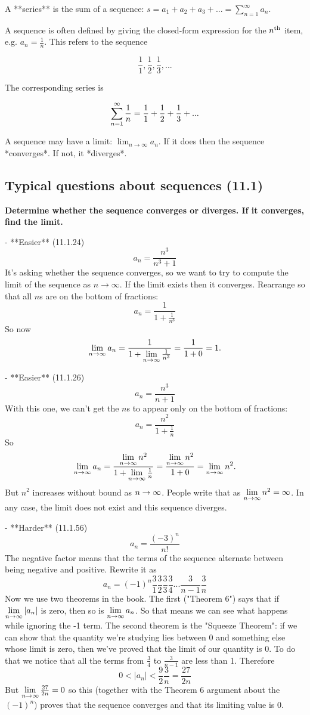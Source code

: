 A **series** is the sum of a sequence: $s = a_1 + a_2 + a_3 + ... = \sum_{n=1}^\infty a_n$.

A sequence is often defined by giving the closed-form expression for the $n^{\text{th}}$ item, e.g. $a_n = \frac{1}{n}$. This refers to the sequence

$$\frac{1}{1}, \frac{1}{2}, \frac{1}{3}, ...$$

The corresponding series is

$$
\sum_{n=1}^{\infty} \frac{1}{n} = \frac{1}{1} + \frac{1}{2} + \frac{1}{3} + ...
$$

A sequence may have a limit: $\lim_{n \rightarrow \infty} a_n$. If it does then the sequence *converges*. If not, it *diverges*.

\subsection{Typical questions about sequences (11.1)}


\textbf*{Determine whether the sequence converges or diverges. If it converges, find the limit.}

- **Easier** (11.1.24)
  $$
  a_n = \frac{n^3}{n^3 + 1}
  $$
  It's asking whether the sequence converges, so we want to try to compute the limit of the sequence as $n \rightarrow \infty$. If the limit exists then it converges. Rearrange so that all $n$s are on the bottom of fractions:
  $$
  a_n = \frac{1}{1 + \frac{1}{n^3}}
  $$
  So now
  $$
  \lim\limits_{n \to \infty} a_n = \frac{1}{1 + \lim\limits_{n \to \infty}\frac{1}{n^3}} = \frac{1}{1 + 0} = 1.
  $$

- **Easier** (11.1.26)
  $$
  a_n = \frac{n^3}{n + 1}
  $$
  With this one, we can't get the $n$s to appear only on the bottom of fractions:
  $$
  a_n = \frac{n^2}{1 + \frac{1}{n}}
  $$
  So
  $$
  \lim\limits_{n \to \infty} a_n = \frac{\lim\limits_{n \to \infty} n^2}{1 + \lim\limits_{n \to \infty}\frac{1}{n}} = \frac{\lim\limits_{n \to \infty} n^2}{1 + 0} = \lim\limits_{n \to \infty} n^2.
  $$
  But $n^2$ increases without bound as $n \rightarrow \infty$. People write that as $\lim\limits_{n \to \infty} n^2 = \infty$. In any case, the limit does not exist and this sequence diverges.

- **Harder** (11.1.56)
  $$
  a_n = \frac{(-3)^n}{n!}
  $$
  The negative factor means that the terms of the sequence alternate between being negative and positive. Rewrite it as
  $$
  a_n = (-1)^n\frac{3}{1}\frac{3}{2}\frac{3}{3}\frac{3}{4}...\frac{3}{n-1}\frac{3}{n}
  $$
  Now we use two theorems in the book. The first ("Theorem 6") says that if $\lim\limits_{n \to \infty} |a_n|$ is zero, then so is $\lim\limits_{n \to \infty} a_n$. So that means we can see what happens while ignoring the -1 term. The second theorem is the "Squeeze Theorem": if we can show that the quantity we're studying lies between 0 and something else whose limit is zero, then we've proved that the limit of our quantity is 0. To do that we notice that all the terms from $\frac{3}{4}$ to $\frac{3}{n-1}$ are less than 1. Therefore
  $$
  0 < |a_n| < \frac{9}{2}\frac{3}{n} = \frac{27}{2n}
  $$
  But $\lim\limits_{n \to \infty} \frac{27}{2n} = 0$ so this (together with the Theorem 6 argument about the $(-1)^n$) proves that the sequence converges and that its limiting value is 0.

